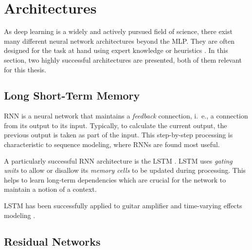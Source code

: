 \section*{Architectures}

As deep learning is a widely and actively pursued field of science, there exist many different neural network architectures beyond the \ac{MLP}. They are often designed for the task at hand using expert knowledge or heuristics \cite{Goodfellow-et-al-2016}. In this section, two highly successful architectures are presented, both of them relevant for this thesis.

\subsection*{Long Short-Term Memory}

\ac{RNN} is a neural network that maintains a \emph{feedback} connection, i.\ e., a connection from its output to its input. Typically, to calculate the current output, the previous output is taken as part of the input. This step-by-step processing is characteristic to sequence modeling, where \acp{RNN} are found most useful.


A particularly successful \ac{RNN} architecture is the \ac{LSTM} \cite{Hochreiter1997}. \ac{LSTM} uses \emph{gating units} to allow or disallow its \emph{memory cells} to be updated during processing. This helps to learn long-term dependencies which are crucial for the network to maintain a notion of a context.

\ac{LSTM} has been successfully applied to guitar amplifier \cite{Wright2019,Wrightetal2020} and time-varying effects modeling \cite{Wright2020}.

\subsection*{Residual Networks}

